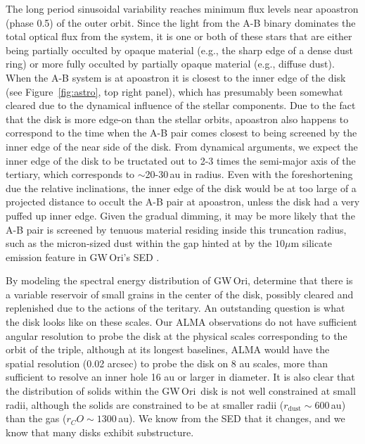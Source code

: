 \documentclass[twocolumn]{aastex61}
\newcommand{\obj}{GW\,Ori}
\newcommand{\twelve}{CO}
\begin{document}
The long period sinusoidal variability reaches minimum flux levels near apoastron (phase 0.5) of the outer orbit. Since the light from the A-B binary dominates the total optical flux from the system, it is one or both of these stars that are either being partially occulted by opaque material (e.g., the sharp edge of a dense dust ring) or more fully occulted by partially opaque material (e.g., diffuse dust). When the A-B system is at apoastron it is closest to the inner edge of the disk (see Figure~\ref{fig:astro}, top right panel), which has presumably been somewhat cleared due to the dynamical influence of the stellar components. Due to the fact that the disk is more edge-on than the stellar orbits, apoastron also happens to correspond to the time when the A-B pair comes closest to being screened by the inner edge of the near side of the disk. From dynamical arguments, we expect the inner edge of the disk to be tructated out to 2-3 times the semi-major axis of the tertiary, which corresponds to $\sim$20-30\,au in radius. Even with the foreshortening due the relative inclinations, the inner edge of the disk would be at too large of a projected distance to occult the A-B pair at apoastron, unless the disk had a very puffed up inner edge. Given the gradual dimming, it may be more likely that the A-B pair is screened by tenuous material residing inside this truncation radius, such as the micron-sized dust within the gap hinted at by the $10\mu$m silicate emission feature in \obj's SED \citep{fang14}.

By modeling the spectral energy distribution of \obj, \citet{fang14} determine that there is a variable reservoir of small grains in the center of the disk, possibly cleared and replenished due to the actions of the teritary. An outstanding question is what the disk looks like on these scales. Our ALMA observations do not have sufficient angular resolution to probe the disk at the physical scales corresponding to the orbit of the triple, although at its longest baselines, ALMA would have the spatial resolution (0.02 arcsec) to probe the disk on 8 au scales, more than sufficient to resolve an inner hole 16 au or larger in diameter.
It is also clear that the distribution of solids within the \obj\ disk is not well constrained at small radii, although the solids are constrained to be at smaller radii ($r_\mathrm{dust} \sim 600$\,au) than the gas ($r_\twelve \sim 1300\,$au). We know from the SED that it changes, and we know that many disks exhibit substructure.
\end{document}
